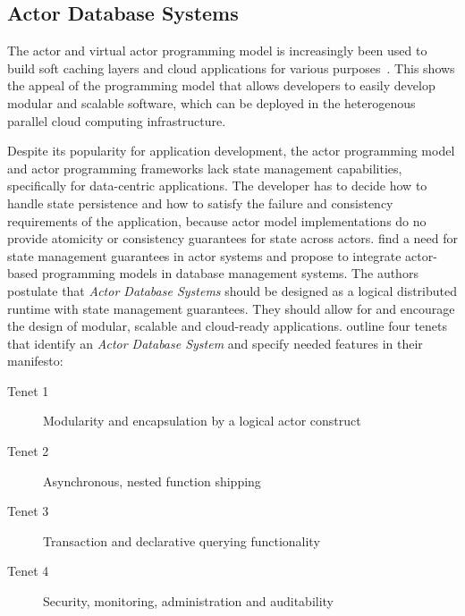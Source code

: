 

  \subsection{Actor Database Systems}
  The actor and virtual actor programming model is increasingly been used to build soft caching layers and cloud applications for various purposes~\cite{erlang_uses,akka_uses,orleans_uses}.
  This shows the appeal of the programming model that allows developers to easily develop modular and scalable software, which can be deployed in the heterogenous parallel cloud computing infrastructure.
  
  Despite its popularity for application development, the actor programming model and actor programming frameworks lack state management capabilities, specifically for data-centric applications.
  The developer has to decide how to handle state persistence and how to satisfy the failure and consistency requirements of the application, because actor model implementations do no provide atomicity or consistency guarantees for state across actors.
   find a need for state management guarantees in actor systems and propose to integrate actor-based programming models in database management systems.
  The authors postulate that \textit{Actor Database Systems} should be designed as a logical distributed runtime with state management guarantees.
  They should allow for and encourage the design of modular, scalable and cloud-ready applications.
   outline four tenets that identify an \textit{Actor Database System} and specify needed features in their manifesto:
  \begin{description}
    \item[Tenet 1] Modularity and encapsulation by a logical actor construct
    \item[Tenet 2] Asynchronous, nested function shipping
    \item[Tenet 3] Transaction and declarative querying functionality
    \item[Tenet 4] Security, monitoring, administration and auditability
  \end{description}

